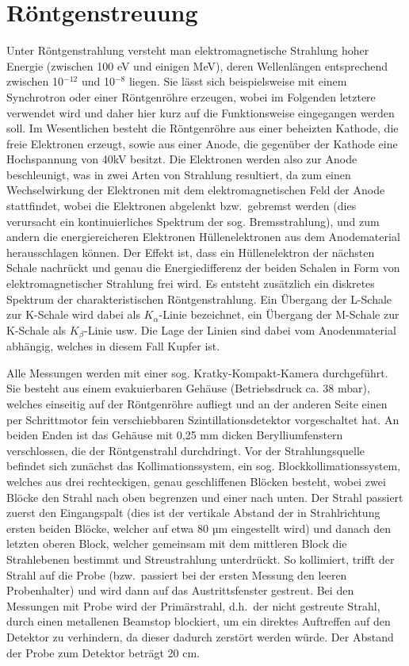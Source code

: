 \documentclass[bigchapter,colorback,accentcolor=tud4b,linedtoc,11pt]{tudreport}
\begin{document}
\section{Röntgenstreuung}

Unter Röntgenstrahlung versteht man elektromagnetische Strahlung hoher Energie (zwischen 100 eV und einigen MeV), deren Wellenlängen entsprechend zwischen 10$^{-12}$ und 10$^{-8}$ liegen. Sie lässt sich beispielsweise mit einem Synchrotron oder einer Röntgenröhre erzeugen, wobei im Folgenden letztere verwendet wird und daher hier kurz auf die Funktionsweise eingegangen werden soll. Im Wesentlichen besteht die Röntgenröhre aus einer beheizten Kathode, die freie Elektronen erzeugt, sowie aus einer Anode, die gegenüber der Kathode eine Hochspannung von 40kV besitzt. Die Elektronen werden also zur Anode beschleunigt, was in zwei Arten von Strahlung resultiert, da zum einen Wechselwirkung der Elektronen mit dem elektromagnetischen Feld der Anode stattfindet, wobei die Elektronen abgelenkt bzw.\ gebremst werden (dies verursacht ein kontinuierliches Spektrum der sog. Bremsstrahlung), und zum andern die energiereicheren Elektronen Hüllenelektronen aus dem Anodematerial herausschlagen können. Der Effekt ist, dass ein Hüllenelektron der nächsten Schale nachrückt und genau die Energiedifferenz der beiden Schalen in Form von elektromagnetischer Strahlung frei wird. Es entsteht zusätzlich ein diskretes Spektrum der charakteristischen Röntgenstrahlung. Ein Übergang der L-Schale zur K-Schale wird dabei als $K_{\alpha}$-Linie bezeichnet, ein Übergang der M-Schale zur K-Schale als $K_{\beta}$-Linie usw. Die Lage der Linien sind dabei vom Anodenmaterial abhängig, welches in diesem Fall Kupfer ist. 

Alle Messungen werden mit einer sog. Kratky-Kompakt-Kamera durchgeführt. Sie besteht aus einem evakuierbaren Gehäuse (Betriebsdruck ca. 38 mbar), welches einseitig auf der Röntgenröhre aufliegt und an der anderen Seite einen per Schrittmotor fein verschiebbaren Szintillationsdetektor vorgeschaltet hat. An beiden Enden ist das Gehäuse mit 0,25 mm dicken Berylliumfenstern verschlossen, die der Röntgenstrahl durchdringt. Vor der Strahlungsquelle befindet sich zunächst das Kollimationssystem, ein sog. Blockkollimationssystem, welches aus drei rechteckigen, genau geschliffenen Blöcken besteht, wobei zwei Blöcke den Strahl nach oben begrenzen und einer nach unten. Der Strahl passiert zuerst den Eingangspalt (dies ist der vertikale Abstand der in Strahlrichtung ersten beiden Blöcke, welcher auf etwa 80 µm eingestellt wird) und danach den letzten oberen Block, welcher gemeinsam mit dem mittleren Block die Strahlebenen bestimmt und Streustrahlung unterdrückt. So kollimiert, trifft der Strahl auf die Probe (bzw.\ passiert bei der ersten Messung den leeren Probenhalter) und wird dann auf das Austrittsfenster gestreut. Bei den Messungen mit Probe wird der Primärstrahl, d.h.\ der nicht gestreute Strahl, durch einen metallenen Beamstop blockiert, um ein direktes Auftreffen auf den Detektor zu verhindern, da dieser dadurch zerstört werden würde. Der Abstand der Probe zum Detektor beträgt 20 cm.
\end{document}

